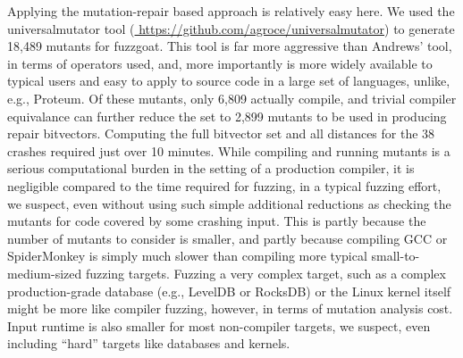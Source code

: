   Applying the mutation-repair based approach is relatively easy here.  We used the universalmutator tool \cite{RegExpMut} (\url{ https://github.com/agroce/universalmutator}) to generate 18,489 mutants for fuzzgoat.  This tool is far more aggressive than Andrews' tool, in terms of operators used, and, more importantly is more widely available to typical users and easy to apply to source code in a large set of languages, unlike, e.g., Proteum.  Of these mutants, only 6,809 actually compile, and trivial compiler equivalance \cite{TCE} can further reduce the set to 2,899 mutants to be used in producing repair bitvectors.  Computing the full bitvector set and all distances for the 38 crashes required just over 10 minutes.  While compiling and running mutants is a serious computational burden in the setting of a production compiler, it is negligible compared to the time required for fuzzing, in a typical fuzzing effort, we suspect, even without using such simple additional reductions as checking the mutants for code covered by some crashing input.  This is partly because the number of mutants to consider is smaller, and partly because compiling GCC or SpiderMonkey is simply much slower than compiling more typical small-to-medium-sized fuzzing targets.  Fuzzing a very complex target, such as a complex production-grade database (e.g., LevelDB or RocksDB) or the Linux kernel itself might be more like compiler fuzzing, however, in terms of mutation analysis cost.  Input runtime is also smaller for most non-compiler targets, we suspect, even including ``hard'' targets like databases and kernels.
  
